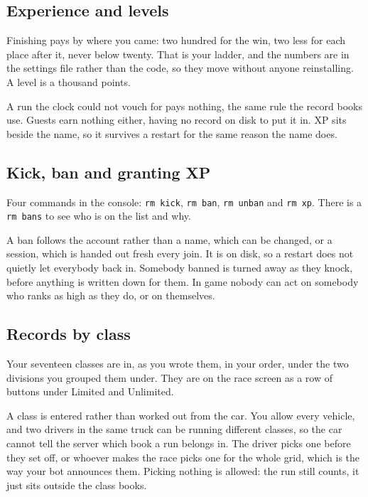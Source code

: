\documentclass[11pt,a4paper]{article}
\newcommand{\code}[1]{\texttt{\small #1}}
\begin{document}
\subsection*{Experience and levels}

Finishing pays by where you came: two hundred for the win, two less for each
place after it, never below twenty. That is your ladder, and the numbers are in
the settings file rather than the code, so they move without anyone
reinstalling. A level is a thousand points.

A run the clock could not vouch for pays nothing, the same rule the record
books use. Guests earn nothing either, having no record on disk to put it in.
XP sits beside the name, so it survives a restart for the same reason the name
does.

\subsection*{Kick, ban and granting XP}

Four commands in the console: \code{rm kick}, \code{rm ban}, \code{rm unban}
and \code{rm xp}. There is a \code{rm bans} to see who is on the list and why.

A ban follows the account rather than a name, which can be changed, or a
session, which is handed out fresh every join. It is on disk, so a restart does
not quietly let everybody back in. Somebody banned is turned away as they knock,
before anything is written down for them. In game nobody can act on somebody who
ranks as high as they do, or on themselves.

\subsection*{Records by class}

Your seventeen classes are in, as you wrote them, in your order, under the two
divisions you grouped them under. They are on the race screen as a row of
buttons under Limited and Unlimited.

A class is entered rather than worked out from the car. You allow every
vehicle, and two drivers in the same truck can be running different classes, so
the car cannot tell the server which book a run belongs in. The driver picks
one before they set off, or whoever makes the race picks one for the whole
grid, which is the way your bot announces them. Picking nothing is allowed: the
run still counts, it just sits outside the class books.
\end{document}
